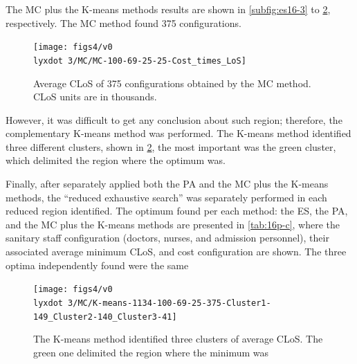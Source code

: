 The MC plus the K-means methods results are shown in \ref{subfig:es16-3}
to \ref{subfig:km16-3}, respectively. The MC method found 375 configurations.
\begin{figure}[H]
\centering{}\texttt{[image: figs4/v0\\lyxdot 3/MC/MC-100-69-25-25-Cost\_times\_LoS]}\caption{Average CLoS of 375 configurations obtained by the MC method. CLoS
units are in thousands.\label{subfig:mc16-3}}
\end{figure}
 However, it was difficult to get any conclusion about such region;
therefore, the complementary K-means method was performed. The K-means
method identified three different clusters, shown in \ref{subfig:km16-3},
the most important was the green cluster, which delimited the region
where the optimum was.

Finally, after separately applied both the PA and the MC plus the
K-means methods, the \textquotedblleft{}reduced exhaustive search\textquotedblright{}
was separately performed in each reduced region identified. The optimum
found per each method: the ES, the PA, and the MC plus the K-means
methods are presented in \ref{tab:16p-c}, where the sanitary staff
configuration (doctors, nurses, and admission personnel), their associated
average minimum CLoS, and cost configuration are shown. The three
optima independently found were the same
\begin{figure}[H]
\begin{centering}
\texttt{[image: figs4/v0\\lyxdot 3/MC/K-means-1134-100-69-25-375-Cluster1-149\_Cluster2-140\_Cluster3-41]}
\par\end{centering}

\caption{The K-means method identified three clusters of average CLoS. The
green one delimited the region where the minimum was \label{subfig:km16-3}}
\end{figure}


